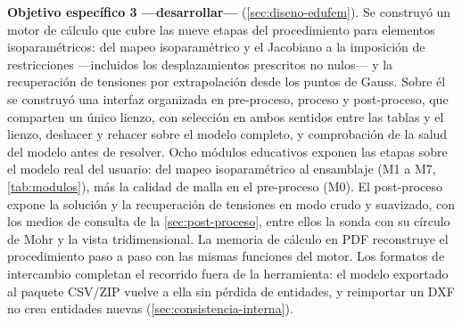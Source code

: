 \textbf{Objetivo específico 3 —desarrollar—} (\autoref{sec:diseno-edufem}). Se construyó un motor de cálculo que cubre las nueve etapas del procedimiento para elementos isoparamétricos: del mapeo isoparamétrico y el Jacobiano a la imposición de restricciones —incluidos los desplazamientos prescritos no nulos— y la recuperación de tensiones por extrapolación desde los puntos de Gauss. Sobre él se construyó una interfaz organizada en pre-proceso, proceso y post-proceso, que comparten un único lienzo, con selección en ambos sentidos entre las tablas y el lienzo, deshacer y rehacer sobre el modelo completo, y comprobación de la salud del modelo antes de resolver. Ocho módulos educativos exponen las etapas sobre el modelo real del usuario: del mapeo isoparamétrico al ensamblaje (M1 a M7, \autoref{tab:modulos}), más la calidad de malla en el pre-proceso (M0). El post-proceso expone la solución y la recuperación de tensiones en modo crudo y suavizado, con los medios de consulta de la \autoref{sec:post-proceso}, entre ellos la sonda con su círculo de Mohr y la vista tridimensional. La memoria de cálculo en PDF reconstruye el procedimiento paso a paso con las mismas funciones del motor. Los formatos de intercambio completan el recorrido fuera de la herramienta: el modelo exportado al paquete CSV/ZIP vuelve a ella sin pérdida de entidades, y reimportar un DXF no crea entidades nuevas (\autoref{sec:consistencia-interna}).


